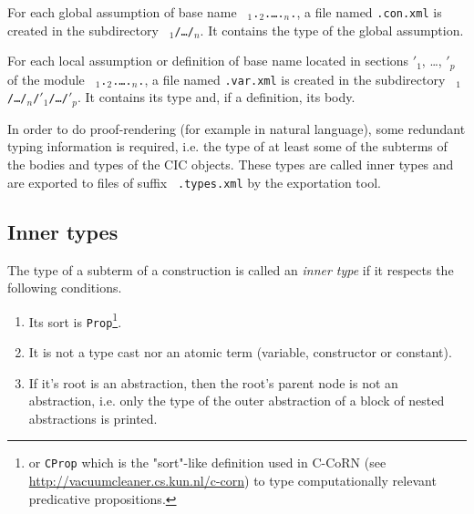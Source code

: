 For each global assumption of base name {\tt
{\ident$_1$}.{\ident$_2$}.{\ldots}.{\ident$_n$}.{\ident}}, a file
named {\tt {\ident}.con.xml} is created in the subdirectory {\tt
{\ident$_1$}/{\ldots}/{\ident$_n$}}.  It contains the type of the
global assumption.

For each local assumption or definition of base name {\ident} located
in sections {\ident$'_1$}, {\ldots}, {\ident$'_p$} of the module {\tt
{\ident$_1$}.{\ident$_2$}.{\ldots}.{\ident$_n$}.{\ident}}, a file
named {\tt {\ident}.var.xml} is created in the subdirectory {\tt
{\ident$_1$}/{\ldots}/{\ident$_n$}/{\ident$'_1$}/\ldots/{\ident$'_p$}}.
It contains its type and, if a definition, its body.

In order to do proof-rendering (for example in natural language), some
redundant typing information is required, i.e. the type of at least
some of the subterms of the bodies and types of the CIC objects. These
types are called inner types and are exported to files of suffix {\tt
.types.xml} by the exportation tool.




\subsection{Inner types}
\label{inner-types}

The type of a subterm of a construction is called an {\em inner type}
if it respects the following conditions.
 
\begin{enumerate}
  \item Its sort is \verb+Prop+\footnote{or {\tt CProp} which is the
    "sort"-like definition used in C-CoRN (see
    \url{http://vacuumcleaner.cs.kun.nl/c-corn}) to type
    computationally relevant predicative propositions.}.
 \item It is not a type cast nor an atomic term (variable, constructor or constant).
 \item If it's root is an abstraction, then the root's parent node is
    not an abstraction, i.e. only the type of the outer abstraction of
    a block of nested abstractions is printed.
\end{enumerate}
                                                                               
